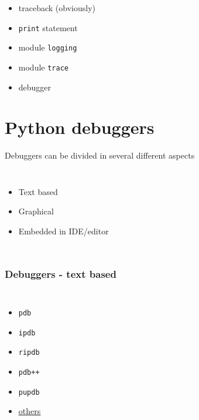 \documentclass[14pt,notes,svgnames,aspectratio=169]{beamer}
\begin{document}
\begin{frame}
    \begin{itemize}
        \item{traceback (obviously)}
        \pause
        \item \lstinline{print} statement
        \pause
        \item module \lstinline{logging}
        \pause
        \item module \lstinline{trace}
        \pause
        \item debugger
    \end{itemize}
\end{frame}

\begingroup
    \section{Python debuggers}
\endgroup

\begin{frame}
    Debuggers can be divided in several different aspects

    \begin{columns}
        \begin{itemize}[<+->]
            \item<1,2,3> Text based 
            \item<2,3> Graphical
            \item<3> Embedded in IDE/editor
        \end{itemize}
    \end{columns}
\end{frame}

\begin{frame}
    \frametitle{Debuggers - text based}
    \begin{columns}
        \begin{itemize}
            \item \lstinline{pdb}
            \item \lstinline{ipdb}
            \item \lstinline{ripdb}
            \item \lstinline{pdb++}
            \item \lstinline{pupdb}
            \item \color{blue}\href{https://wiki.python.org/moin/PythonDebuggingTools}{\uline{others}}
        \end{itemize}
    \end{columns}
\end{frame}
\end{document}
